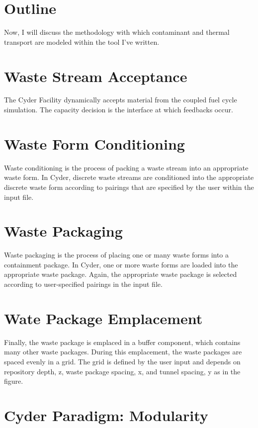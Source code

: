 \documentclass[letterpaper]{article}
\begin{document}
\section{Outline}

Now, I will discuss the methodology with which contaminant and thermal 
transport are modeled within the tool I've written.

\section{Waste Stream Acceptance}

The Cyder Facility dynamically accepts material from the coupled fuel
cycle simulation. The capacity decision is the interface at which feedbacks 
occur.

\section{Waste Form Conditioning}

Waste conditioning is the process of packing a waste stream into an appropriate 
waste form.  In Cyder, discrete waste streams are conditioned into the 
appropriate discrete waste form according to pairings that are specified by the 
user within the input file.

\section{Waste Packaging}

Waste packaging is the process of placing one or many waste forms into a 
containment package.  In Cyder, one or more waste forms are loaded into the 
appropriate waste package. Again, the appropriate waste package is selected 
according to user-specified pairings in the input file. 


\section{Wate Package Emplacement}

Finally, the waste package is emplaced in a buffer component, which contains 
many other waste packages. During this emplacement, the waste packages are 
spaced evenly in a grid. The grid is defined by the user input and depends on 
repository depth, z, waste package spacing, x, and tunnel spacing, y as in 
the figure.

\section{Cyder Paradigm: Modularity}
\end{document}
